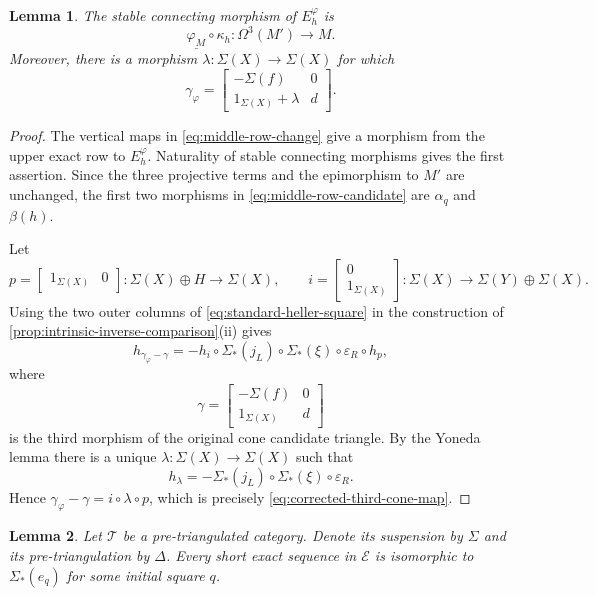 \documentclass[a4paper,11pt,reqno]{amsart}
\newtheorem{lemma}[lemma]{Lemma}
\theoremstyle{definition}
\theoremstyle{plain}
\numberwithin{equation}{section}
\newcommand{\T}{\mathcal T}
\begin{document}
\begin{lemma}
\label{lem:middle-row-correction}
The stable connecting morphism of \(E_h^\varphi\) is
\[
 \underline{\varphi_M}\circ\kappa_h:
 \Omega^3(M')\longrightarrow M.
\]
Moreover, there is a morphism
\(\lambda:\Sigma(X)\to\Sigma(X)\) for which
\begin{equation}
\label{eq:corrected-third-cone-map}
 \gamma_\varphi=
 \begin{bmatrix}
  -\Sigma(f)&0\\
  1_{\Sigma(X)}+\lambda&d
 \end{bmatrix}.
\end{equation}
\end{lemma}

\begin{proof}
The vertical maps in \eqref{eq:middle-row-change} give a morphism from the
upper exact row to \(E_h^\varphi\).  Naturality of stable connecting
morphisms gives the first assertion.  Since the three projective terms and
the epimorphism to \(M'\) are unchanged, the first two morphisms in
\eqref{eq:middle-row-candidate} are \(\alpha_q\) and \(\beta(h)\).

Let
\[
 p=\begin{bmatrix}1_{\Sigma(X)}&0\end{bmatrix}:
   \Sigma(X)\oplus H\longrightarrow\Sigma(X),
 \qquad
 i=\begin{bmatrix}0\\1_{\Sigma(X)}\end{bmatrix}:
   \Sigma(X)\longrightarrow\Sigma(Y)\oplus\Sigma(X).
\]
Using the two outer columns of \eqref{eq:standard-heller-square} in the
construction of \cref{prop:intrinsic-inverse-comparison}\textup{(ii)} gives
\[
 h_{\gamma_\varphi-\gamma}
 =-h_i\circ\Sigma_*(j_L)\circ\Sigma_*(\xi)
   \circ\varepsilon_R\circ h_p,
\]
where
\[
 \gamma=
 \begin{bmatrix}
  -\Sigma(f)&0\\ 1_{\Sigma(X)}&d
 \end{bmatrix}
\]
is the third morphism of the original cone candidate triangle.  By the Yoneda lemma
there is a unique \(\lambda:\Sigma(X)\to\Sigma(X)\) such that
\[
 h_\lambda
 =-\Sigma_*(j_L)\circ\Sigma_*(\xi)\circ\varepsilon_R.
\]
Hence \(\gamma_\varphi-\gamma=i\circ\lambda\circ p\), which is precisely
\eqref{eq:corrected-third-cone-map}.
\end{proof}

\begin{lemma}
\label{lem:realize-short-exact-sequence}
Let \(\T\) be a pre-triangulated category.  Denote its suspension by
\(\Sigma\) and its pre-triangulation by \(\Delta\).  Every short exact sequence in
\(\mathcal E\) is isomorphic to \(\Sigma_*(e_q)\) for some initial square
\(q\).
\end{lemma}
\end{document}
